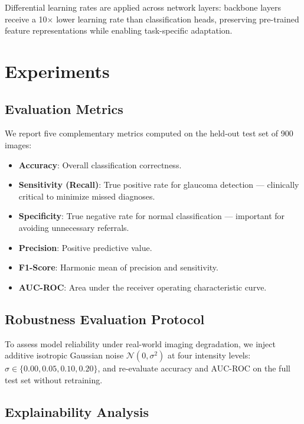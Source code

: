 \documentclass[conference]{IEEEtran}
\begin{document}
Differential learning rates are applied across 
network layers: backbone layers receive a 10$\times$ 
lower learning rate than classification heads, 
preserving pre-trained feature representations 
while enabling task-specific adaptation.


\section{Experiments}
\label{sec:experiments}

\subsection{Evaluation Metrics}

We report five complementary metrics computed on 
the held-out test set of 900 images:

\begin{itemize}
    \item \textbf{Accuracy}: Overall classification 
    correctness.
    \item \textbf{Sensitivity (Recall)}: True positive 
    rate for glaucoma detection --- clinically critical 
    to minimize missed diagnoses.
    \item \textbf{Specificity}: True negative rate 
    for normal classification --- important for 
    avoiding unnecessary referrals.
    \item \textbf{Precision}: Positive predictive value.
    \item \textbf{F1-Score}: Harmonic mean of 
    precision and sensitivity.
    \item \textbf{AUC-ROC}: Area under the 
    receiver operating characteristic curve.
\end{itemize}

\subsection{Robustness Evaluation Protocol}

To assess model reliability under real-world 
imaging degradation, we inject additive 
isotropic Gaussian noise $\mathcal{N}(0, \sigma^2)$ 
at four intensity levels: 
$\sigma \in \{0.00, 0.05, 0.10, 0.20\}$, 
and re-evaluate accuracy and AUC-ROC on the 
full test set without retraining.

\subsection{Explainability Analysis}
\end{document}
